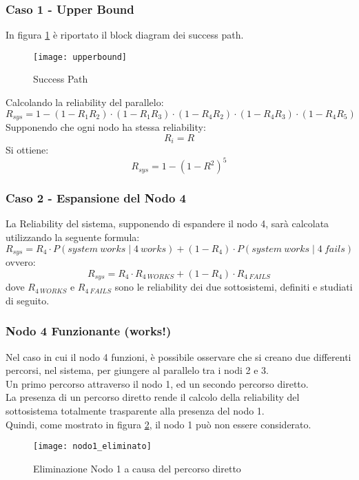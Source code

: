 \clearpage

\subsubsection{Caso 1 - Upper Bound}
In figura \ref{dep_upperbound} è riportato il block diagram dei success path.

\begin{figure}[!htbp]
  \centering
  \texttt{[image: upperbound]}
  \caption{Success Path}
  \label{dep_upperbound}
\end{figure}

Calcolando la reliability del parallelo:
$$R_{sys} = 1-(1-R_1R_2) \cdot (1-R_1R_3) \cdot (1-R_4R_2) \cdot (1-R_4R_3) \cdot (1-R_4R_5)$$
Supponendo che ogni nodo ha stessa reliability: $$R_i = R$$
Si ottiene: $$R_{sys} = 1-(1-R^2)^5$$

\clearpage

\subsubsection{Caso 2 - Espansione del Nodo 4}
La Reliability del sistema, supponendo di espandere il nodo 4, sarà calcolata
utilizzando la seguente formula:
$$R_{sys} = R_4 \cdot P(system\ works \mid 4\ works) + (1-R_4)\cdot P(system\ works \mid 4\ fails)$$
ovvero:
$$R_{sys} = R_4 \cdot R_{4\ WORKS} + (1-R_4)\cdot R_{4\ FAILS}$$
dove $R_{4\ WORKS}$ e $R_{4\ FAILS}$ sono le reliability dei due sottosistemi,
definiti e studiati di seguito.\\
\subsubsection*{Nodo 4 Funzionante (works!)}
Nel caso in cui il nodo 4 funzioni, è possibile osservare che si creano
due differenti percorsi, nel sistema, per giungere al parallelo tra i nodi 2 e 3.\\
Un primo percorso attraverso il nodo 1, ed un secondo percorso diretto.\\
La presenza di un percorso diretto rende il calcolo della reliability del
sottosistema totalmente trasparente alla presenza del nodo 1.\\
Quindi, come mostrato in figura \ref{dep_nodo1_eliminato}, il nodo 1 può non essere
considerato.\\
\begin{figure}[!htbp]
  \centering
  \texttt{[image: nodo1\_eliminato]}
  \caption{Eliminazione Nodo 1 a causa del percorso diretto}
  \label{dep_nodo1_eliminato}
\end{figure}


